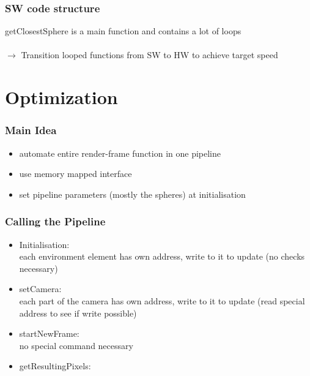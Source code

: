 \documentclass{beamer}
\begin{document}
\begin{frame} %
	\frametitle{SW code structure} %
	getClosestSphere is a main function and contains a lot of loops\\
	$\quad$\\
	$\rightarrow$ Transition looped functions from SW to HW to achieve target speed
\end{frame}

\section{Optimization}


\begin{frame} %
	\frametitle{Main Idea}
	\begin{itemize}
	\item automate entire render-frame function in one pipeline
	\item use memory mapped interface
	\item set pipeline parameters (mostly the spheres) at initialisation
	\end{itemize}
\end{frame}

\begin{frame} %
	\frametitle{Calling the Pipeline} %
	\begin{itemize}
		\item Initialisation:\\
		each environment element has own address, write to it to update (no checks necessary)
		\item setCamera:\\
		each part of the camera has own address, write to it to update (read special address to see if write possible)
		\item startNewFrame:\\
		no special command necessary
		\item getResultingPixels:\\
	\end{itemize}
\end{frame}
\end{document}
